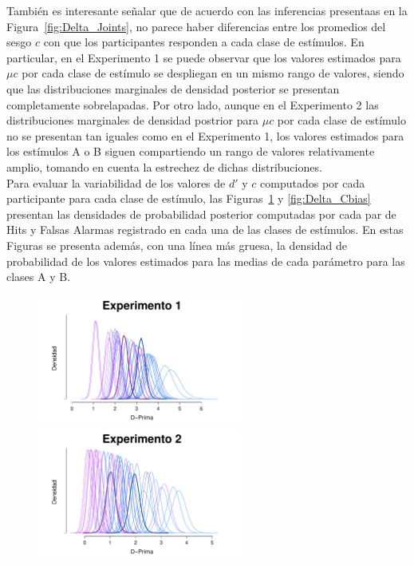 También es interesante señalar que de acuerdo con las inferencias presentaas en la Figura~\ref{fig:Delta_Joints}, no parece haber diferencias entre los promedios del sesgo $c$ con que los participantes responden a cada clase de estímulos. En particular, en el Experimento 1 se puede observar que los valores estimados para $\mu c$ por cada clase de estímulo se despliegan en un mismo rango de valores, siendo que las distribuciones marginales de densidad posterior se presentan completamente sobrelapadas. Por otro lado, aunque en el Experimento 2 las distribuciones marginales de densidad postrior para $\mu c$ por cada clase de estímulo no se presentan tan iguales como en el Experimento 1, los valores estimados para los estímulos A o B siguen compartiendo un rango de valores relativamente amplio, tomando en cuenta la estrechez de dichas distribuciones.\\

Para evaluar la variabilidad de los valores de $d'$ y $c$ computados por cada participante para cada clase de estímulo, las Figuras~\ref{fig:Delta_Dprima} y \ref{fig:Delta_Cbias} presentan las densidades de probabilidad posterior computadas por cada par de Hits y Falsas Alarmas registrado en cada una de las clases de estímulos. En estas Figuras se presenta además, con una línea más gruesa, la densidad de probabilidad de los valores estimados para las medias de cada parámetro para las clases A y B.\\

\begin{figure}[th]
\centering
\includegraphics[width=0.6\textwidth]{Figures/MDelta_Dprima_E1}\\
\includegraphics[width=0.6\textwidth]{Figures/MDelta_Dprima_E2}\\
\caption[Modelo Delta: Distribuciones posteriores conjuntas para las medias de $d'$ y $c$ en cada clase de estímulo]{}
\label{fig:Delta_Dprima}
\end{figure}

